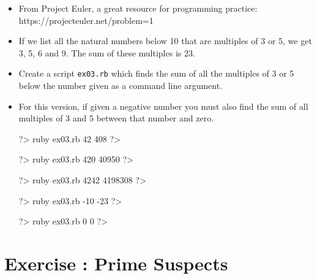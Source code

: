 \documentclass{42-en}
\begin{document}
\begin{itemize}

\item From Project Euler, a great resource for programming practice:\\
https://projecteuler.net/problem=1
\item If we list all the natural numbers below 10 that are multiples of 3 or 5, we get 3, 5, 6 and 9. The sum of these multiples is 23.
\item Create a script \texttt{ex03.rb} which finds the sum of all the multiples of 3 or 5 below the number given as a command line argument.
\item For this version, if given a negative number you must also find the sum of all multiples of 3 and 5 between that number and zero.

\begin{42console}
	?> ruby ex03.rb 42
	408
	?>
\end{42console}

\begin{42console}
	?> ruby ex03.rb 420
	40950
	?>
\end{42console}

\begin{42console}
	?> ruby ex03.rb 4242
	4198308
	?>
\end{42console}

\begin{42console}
	?> ruby ex03.rb -10
	-23
	?>
\end{42console}

\begin{42console}
	?> ruby ex03.rb 0
	0
	?>
\end{42console}

\end{itemize}



\chapter{Exercise \exercicenumber: Prime Suspects}

\exnumber{\exercicenumber}
\end{document}
